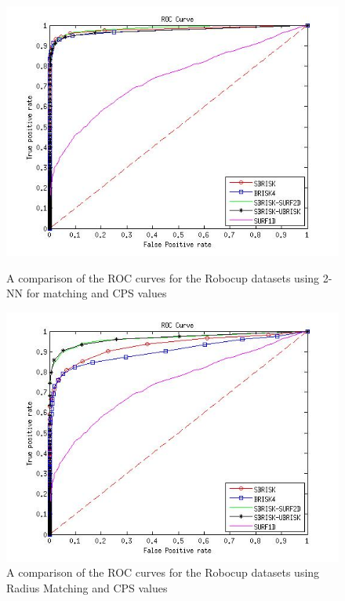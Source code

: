 \documentclass[11pt]{report}
\begin{document}
\begin{figure}[ht!]
\begin{minipage}[b]{0.5\linewidth}
\includegraphics[scale=0.4]{../Drawings/RobocupDataset/ROC_General_KNN_consistent.jpg}
\caption{A comparison of the ROC curves for the Robocup datasets using 2-NN for matching and CPS values}
\label{fig:compareKNNConsist}
\end{minipage}
\hspace{0.5cm}
\begin{minipage}[b]{0.5\linewidth}
\includegraphics[scale=0.4]{../Drawings/RobocupDataset/ROC_General_Hamming_consistent.jpg}
\caption{A comparison of the ROC curves for the Robocup datasets using Radius Matching and CPS values}
\label{fig:compareHammingConsistent}
\end{minipage}
\end{figure}
\end{document}
